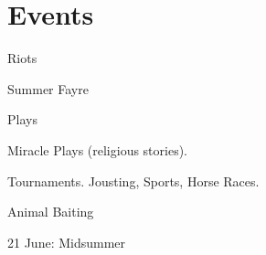 

\section{Events}
Riots

Summer Fayre

Plays

Miracle Plays (religious stories).

Tournaments. Jousting, Sports, Horse Races.

Animal Baiting

21 June: Midsummer



